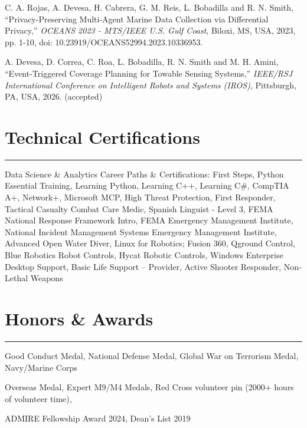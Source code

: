 \documentclass[10pt,letterpaper]{article}
\newcommand{\sectionrule}{\vspace{-2pt}\hrule\vspace{4pt}}
\begin{document}
\vspace{4pt}
\noindent C. A. Rojas, A. Devesa, H. Cabrera, G. M. Reis, L. Bobadilla and R. N. Smith, ``Privacy-Preserving
Multi-Agent Marine Data Collection via Differential Privacy,'' \textit{OCEANS 2023 - MTS/IEEE U.S. Gulf
Coast}, Biloxi, MS, USA, 2023, pp. 1-10, doi: 10.23919/OCEANS52994.2023.10336953.

\vspace{4pt}
\noindent A. Devesa, D. Correa, C. Roa, L. Bobadilla, R. N. Smith and M. H. Amini, ``Event-Triggered
Coverage Planning for Towable Sensing Systems,'' \textit{IEEE/RSJ International Conference on Intelligent
Robots and Systems (IROS)}, Pittsburgh, PA, USA, 2026. (accepted)

\section{Technical Certifications}
\sectionrule
\fontsize{9}{11}\selectfont
Data Science \& Analytics Career Paths \& Certifications: First Steps, Python Essential Training, Learning
Python, Learning C++, Learning C\#, CompTIA A+, Network+, Microsoft MCP, High Threat Protection, First
Responder, Tactical Casualty Combat Care Medic, Spanish Linguist - Level 3, FEMA National Response
Framework Intro, FEMA Emergency Management Institute, National Incident Management Systems Emergency
Management Institute, Advanced Open Water Diver, Linux for Robotics; Fusion 360, Qground Control, Blue
Robotics Robot Controls, Hycat Robotic Controls, Windows Enterprise Desktop Support, Basic Life Support --
Provider, Active Shooter Responder, Non-Lethal Weapons

\section{Honors \& Awards}
\sectionrule
\fontsize{9}{11}\selectfont
\centerline{Good Conduct Medal, National Defense Medal, Global War on Terrorism Medal, Navy/Marine Corps}
\centerline{Overseas Medal, Expert M9/M4 Medals, Red Cross volunteer pin (2000+ hours of volunteer time),}
\centerline{ADMIRE Fellowship Award 2024, Dean's List 2019}
\end{document}
